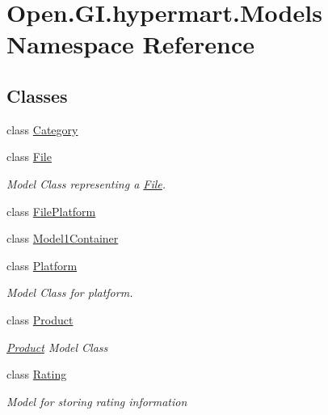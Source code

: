 \hypertarget{namespace_open_1_1_g_i_1_1hypermart_1_1_models}{}\section{Open.\+G\+I.\+hypermart.\+Models Namespace Reference}
\label{namespace_open_1_1_g_i_1_1hypermart_1_1_models}
\subsection*{Classes}
\begin{DoxyCompactItemize}
\item 
class \hyperlink{class_open_1_1_g_i_1_1hypermart_1_1_models_1_1_category}{Category}
\item 
class \hyperlink{class_open_1_1_g_i_1_1hypermart_1_1_models_1_1_file}{File}
\begin{DoxyCompactList}\small\item\em Model Class representing a \hyperlink{class_open_1_1_g_i_1_1hypermart_1_1_models_1_1_file}{File}. \end{DoxyCompactList}\item 
class \hyperlink{class_open_1_1_g_i_1_1hypermart_1_1_models_1_1_file_platform}{File\+Platform}
\item 
class \hyperlink{class_open_1_1_g_i_1_1hypermart_1_1_models_1_1_model1_container}{Model1\+Container}
\item 
class \hyperlink{class_open_1_1_g_i_1_1hypermart_1_1_models_1_1_platform}{Platform}
\begin{DoxyCompactList}\small\item\em Model Class for platform. \end{DoxyCompactList}\item 
class \hyperlink{class_open_1_1_g_i_1_1hypermart_1_1_models_1_1_product}{Product}
\begin{DoxyCompactList}\small\item\em \hyperlink{class_open_1_1_g_i_1_1hypermart_1_1_models_1_1_product}{Product} Model Class \end{DoxyCompactList}\item 
class \hyperlink{class_open_1_1_g_i_1_1hypermart_1_1_models_1_1_rating}{Rating}
\begin{DoxyCompactList}\small\item\em Model for storing rating information \end{DoxyCompactList}\item 

\end{DoxyCompactItemize}

